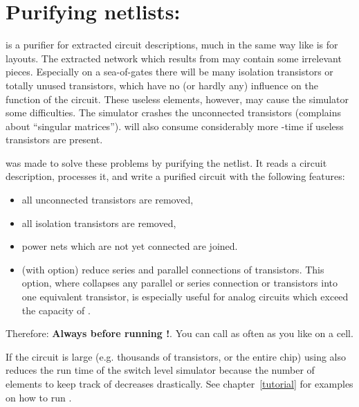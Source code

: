 \section{Purifying netlists: }
 is a purifier for extracted circuit descriptions, much in the same
way like  is for layouts. The extracted network which results from
 may contain some irrelevant pieces. Especially on a sea-of-gates
there will be many isolation transistors 
or totally unused transistors, which
have no (or hardly any) influence on the function of the circuit. These
useless elements, however, may cause the simulator some difficulties. The
 simulator crashes the unconnected transistors (complains about ``singular matrices'').  will
also consume considerably more -time if useless transistors are
present.

 was made to solve these problems by purifying the
netlist. It reads a circuit description, processes it, and write a purified
circuit with the following features:
\begin{itemize}
\item
all unconnected transistors are removed,
\item
all isolation transistors are removed,
\item
power nets which are not yet connected are joined.
\item
(with  option) reduce series and parallel connections of transistors.
This option, where  collapses any parallel or series connection or
transistors into one equivalent transistor, is especially useful for analog
circuits which exceed the capacity of .
\end{itemize}
Therefore: {\bf Always  before running !}.
You can call  as often as you like on a cell. 

If the circuit is large (e.g. thousands of transistors, or the entire chip)
using  also reduces the run time of the switch level simulator
 because the number of elements to keep track of decreases
drastically. See chapter~\ref{tutorial} for examples on how to run
. 



